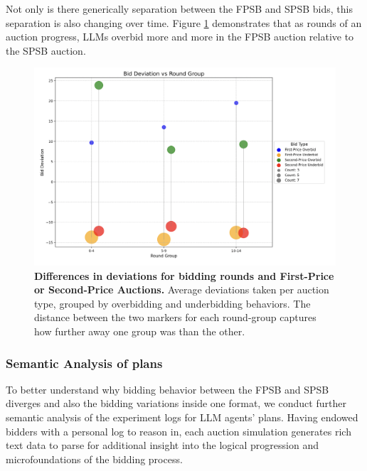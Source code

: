 \documentclass{article} %
\begin{document}
Not only is there generically separation between the FPSB and SPSB bids, this separation is also changing over time. 
Figure \ref{fig:FPSBvsSPSBbyTime} demonstrates that as rounds of an auction progress, LLMs overbid more and more in the FPSB auction relative to the SPSB auction.

\begin{figure}[h!]
    \centering 
    \hspace{2cm}\includegraphics[width=0.75\linewidth]{Figs/FP_SP_round.png}
    \caption{\textbf{ Differences in deviations for bidding rounds and First-Price or Second-Price Auctions.} Average deviations taken per auction type, grouped by overbidding and underbidding behaviors. The distance between the two markers for each round-group captures how further away one group was than the other. }
    \label{fig:FPSBvsSPSBbyTime}
\end{figure}






\subsubsection{Semantic Analysis of plans}

To better understand why bidding behavior between the FPSB and SPSB diverges and also the bidding variations inside one format, we conduct further semantic analysis of the experiment logs for LLM agents' plans. Having endowed bidders with a personal log to reason in, each auction simulation generates rich text data to parse for additional insight into the logical progression and microfoundations of the bidding process.

\end{document}
